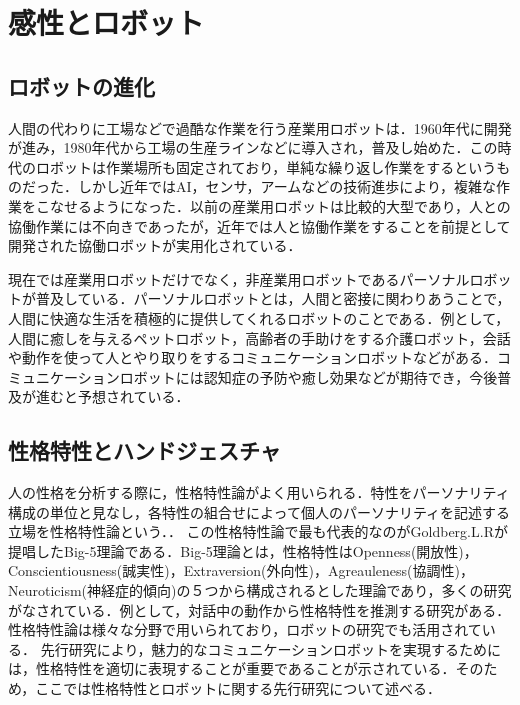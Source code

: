 \newpage

\section{感性とロボット}
\label{sec2.3}

\subsection{ロボットの進化}
\label{sec2.3.1}
人間の代わりに工場などで過酷な作業を行う産業用ロボットは．1960年代に開発が進み，1980年代から工場の生産ラインなどに導入され，普及し始めた．この時代のロボットは作業場所も固定されており，単純な繰り返し作業をするというものだった．しかし近年ではAI，センサ，アームなどの技術進歩により，複雑な作業をこなせるようになった．以前の産業用ロボットは比較的大型であり，人との協働作業には不向きであったが，近年では人と協働作業をすることを前提として開発された協働ロボットが実用化されている．

現在では産業用ロボットだけでなく，非産業用ロボットであるパーソナルロボットが普及している．パーソナルロボットとは，人間と密接に関わりあうことで，人間に快適な生活を積極的に提供してくれるロボットのことである．例として，人間に癒しを与えるペットロボット，高齢者の手助けをする介護ロボット，会話や動作を使って人とやり取りをするコミュニケーションロボットなどがある．コミュニケーションロボットには認知症の予防や癒し効果などが期待でき，今後普及が進むと予想されている．


\subsection{性格特性とハンドジェスチャ}
\label{sec2.3.2}

人の性格を分析する際に，性格特性論がよく用いられる．特性をパーソナリティ構成の単位と見なし，各特性の組合せによって個人のパーソナリティを記述する立場を性格特性論という．\cite{性格特性論}．
この性格特性論で最も代表的なのがGoldberg.L.Rが提唱したBig-5理論である．Big-5理論とは，性格特性はOpenness(開放性)，Conscientiousness(誠実性)，Extraversion(外向性)，Agreauleness(協調性)，Neuroticism(神経症的傾向)の５つから構成されるとした理論であり，多くの研究がなされている．例として，対話中の動作から性格特性を推測する研究がある\cite{性格特性推測}．性格特性論は様々な分野で用いられており，ロボットの研究でも活用されている．
先行研究により，魅力的なコミュニケーションロボットを実現するためには，性格特性を適切に表現することが重要であることが示されている\cite{ロボットの性格特性1}\cite{ロボットの性格特性2}\cite{ロボットの性格特性3}．そのため，ここでは性格特性とロボットに関する先行研究について述べる．

